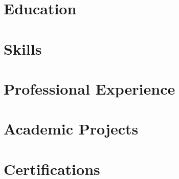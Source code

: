 \documentclass[letter,10pt]{article}
\begin{document}


\section{Education}


\section{Skills}


\section{Professional Experience}


\section{Academic Projects}


\section{Certifications}


% 
\end{document}
